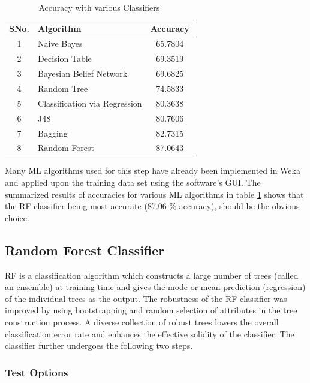 \documentclass{llncs}
\begin{document}
\begin{table}[!t]
    \renewcommand{\arraystretch}{1.2}
    \caption{Accuracy with various Classifiers}
    \label{classifier}
    \centering
        \begin{tabular}{|c|l|c|}
        \hline\rule{0pt}{12pt}
        \textbf{SNo.} & \textbf{Algorithm} & \textbf{Accuracy} \\[2pt]
        \hline
        1 & Naive Bayes & 65.7804 \\ \hline
        2 & Decision Table & 69.3519 \\ \hline
        3 & Bayesian Belief Network & 69.6825 \\ \hline
        4 & Random Tree & 74.5833 \\ \hline
        5 & Classification via Regression & 80.3638 \\ \hline
        6 & J48 & 80.7606 \\ \hline
        7 & Bagging & 82.7315 \\ \hline
        8 & Random Forest & 87.0643 \\ \hline
        \end{tabular}
\end{table}


Many ML algorithms used for this step have already been implemented in Weka and applied upon the training data set using the software's GUI. The summarized results of accuracies for various ML algorithms in table \ref{classifier} shows that the RF classifier being most accurate (87.06 \% accuracy), should be the obvious choice.

\subsection{Random Forest Classifier}
RF is a classification algorithm which constructs a large number of trees (called an ensemble) at training time and gives the mode or mean prediction (regression) of the individual trees as the output. The robustness of the RF classifier was improved by using bootstrapping and random selection of attributes in the tree construction process. A diverse collection of robust trees lowers the overall classification error rate and enhances the effective solidity of the classifier. The classifier further undergoes the following two steps.

\subsubsection{Test Options}
\end{document}
